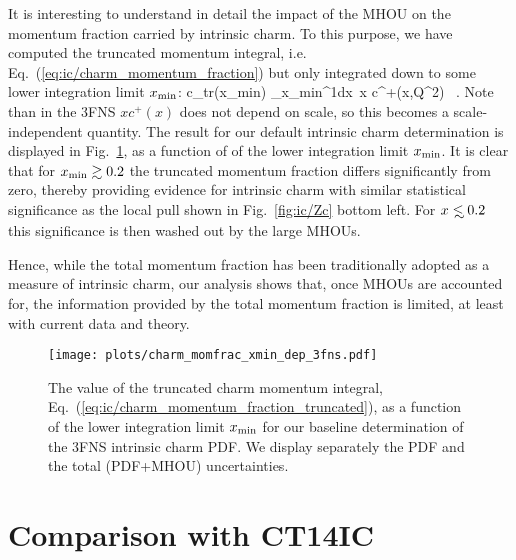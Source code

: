 It is interesting to understand in detail the impact of the MHOU on
the momentum fraction carried by intrinsic charm. To this purpose, we
have computed  the truncated momentum integral, i.e. 
  Eq.~(\ref{eq:ic/charm_momentum_fraction}) but only integrated down to
  some  lower
  integration limit $x_{\rm min}$:
  \be
\label{eq:ic/charm_momentum_fraction_truncated}
\lc c\rc_{\rm tr}(x_{\rm min}) \equiv \int_{x_{\rm min}}^1dx\, x c^+(x,Q^2) \, .
\ee
Note than in the 3FNS   $x
c^+(x)$ does not depend on scale, so  this becomes
a scale-independent quantity.
%
The result for our default intrinsic charm determination is displayed
in Fig.~\ref{fig:ic/charm_momfrac_xmin_dep}, as a function of
of the lower integration limit $x_{\rm min}$.
%
It is clear that for $x_{\rm min} \gtrsim 0.2$ the truncated momentum
fraction  differs significantly from zero, thereby providing evidence
for intrinsic charm with similar statistical  significance as the
local pull shown in Fig.~\ref{fig:ic/Zc} bottom left.
%
For $x \lsim 0.2$
this  significance is then washed out
by the large MHOUs.

Hence, while the total momentum fraction has been traditionally adopted
as a measure of intrinsic charm, 
our analysis shows that, once MHOUs are accounted for, the information
provided by the total momentum fraction is limited, at least with
current data and theory.



\begin{figure}[h!]
  \begin{center}
    \texttt{[image: plots/charm\_momfrac\_xmin\_dep\_3fns.pdf]}
    \caption{\small The value of the truncated charm momentum integral,
      Eq.~(\ref{eq:ic/charm_momentum_fraction_truncated}), as a function
      of the lower integration limit $x_{\rm min}$
      for our baseline determination of the 3FNS intrinsic charm PDF.
      We display separately the PDF and the total (PDF+MHOU) uncertainties.
  \label{fig:ic/charm_momfrac_xmin_dep} }
\end{center}
\end{figure}


\clearpage
\section{Comparison with  CT14IC}
\label{app:ic/ct}

